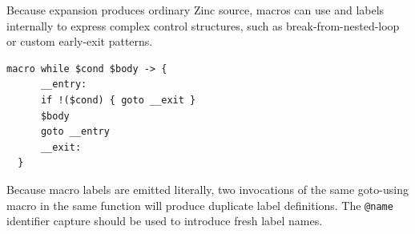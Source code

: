 Because expansion produces ordinary Zinc source, macros can use  and labels internally to express complex control structures, such as break-from-nested-loop or custom early-exit patterns.

\begin{lstlisting}[style=zinc, caption={A \texttt{while} macro using \texttt{goto}}]
  macro while $cond $body -> {
      __entry:
      if !($cond) { goto __exit }
      $body
      goto __entry
      __exit:
  }
\end{lstlisting}

\begin{warn}
  Because macro labels are emitted literally, two invocations of the same goto-using macro in the same function will produce duplicate label definitions.
  The \texttt{@name} identifier capture should be used to introduce fresh label names.
\end{warn}
